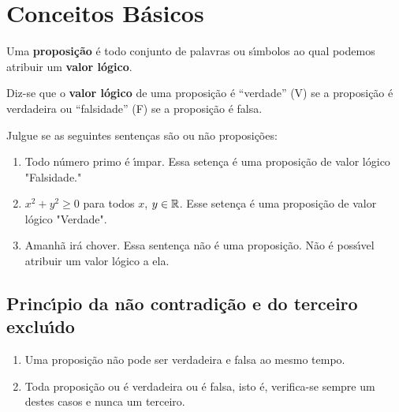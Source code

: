 \chapter{Conceitos B\'asicos} %
\label{cha:conceitos_basicos}

\begin{definicao}
	Uma \textbf{proposi\c{c}\~ao} \'e todo conjunto de palavras ou s{\'\i}mbolos ao qual podemos atribuir um \textbf{valor l\'ogico}.
\end{definicao}

\begin{definicao}
	Diz-se que o \textbf{valor l\'ogico} de uma proposi\c{c}\~ao \'e ``verdade'' (V) se a proposi\c{c}\~ao \'e verdadeira ou ``falsidade'' (F) se a proposi\c{c}\~ao \'e falsa.
\end{definicao}

\begin{exemplos}
	Julgue se as seguintes senten\c{c}as s\~ao ou n\~ao proposi\c{c}\~oes:
	\begin{enumerate}[label={\arabic*})]
		\item Todo n\'umero primo \'e {\'\i}mpar.
		Essa seten\c{c}a \'e uma proposi\c{c}\~ao de valor l\'ogico "Falsidade."
		\item $x^2 + y^2 \ge 0$ para todos $x$, $y \in \mathbb{R}$.
		Esse seten\c{c}a \'e uma proposi\c{c}\~ao de valor l\'ogico "Verdade".
		\item Amanh\~a ir\'a chover.
		Essa senten\c{c}a n\~ao \'e uma proposi\c{c}\~ao. N\~ao \'e poss{\'\i}vel atribuir um valor l\'ogico a ela.
	\end{enumerate}

\end{exemplos}

\section{Princ{\'\i}pio da n\~ao contradi\c{c}\~ao e do terceiro exclu{\'\i}do} %
\label{sec:principio_da_nao_contradicao_e_do_3}
\begin{enumerate}[label={\roman*})]
	\item Uma proposi\c{c}\~ao n\~ao pode ser verdadeira e falsa ao mesmo tempo.
	\item Toda proposi\c{c}\~ao ou \'e verdadeira ou \'e falsa, isto \'e, verifica-se sempre um destes casos e nunca um terceiro.
\end{enumerate}

